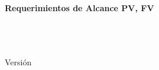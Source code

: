
  \thispagestyle{empty}


  \begin{flushright}

    \begin{minipage}{0.6\textwidth}
      \begin{flushleft}
          \sffamily
          \vspace{2cm}
          \LARGE \textbf{Requerimientos de Alcance PV, FV} \\
          \footnotesize \textcolor{black!60}{\rtid} \\[1cm]
          \Huge \textbf{\rttitulo} \\
      \end{flushleft}
    \end{minipage}%

    \vfill
    \begin{minipage}{0.6\textwidth}
        \begin{center}
          \sffamily
          \small \rtlocal \\
          Versión \rtversao \\
          \rtdata \\
        \end{center}
    \end{minipage}%
  \end{flushright}
